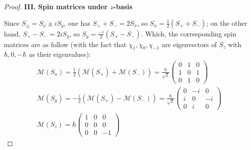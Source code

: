 \documentclass{article}
\begin{document}
\begin{proof}
    \hfil

    \textbf{III. Spin matrices under $z$-basis}

    Since $S_\pm = S_x\pm iS_y$, one has $S_++S_- = 2S_x$, so $S_x = \frac{1}{2}(S_++S_-)$; on the other hand, $S_+-S_- = 2iS_y$, so $S_y = \frac{-i}{2}(S_+-S_-)$. Which, the corresponding spin matrices are as follow (with the fact that $\chi_1,\chi_0,\chi_{-1}$ are eigenvectors of $S_z$ with $\hbar, 0,-\hbar$ as their eigenvalues):
    \begin{align}
        &\mathcal{M}(S_x) = \frac{1}{2}(\mathcal{M}(S_+)+\mathcal{M}(S_-)) = \frac{\hbar}{\sqrt{2}}\begin{pmatrix}
            0&1&0\\1&0&1\\0&1&0
        \end{pmatrix}\\
        &\mathcal{M}(S_y) = -\frac{i}{2}(\mathcal{M}(S_+)-\mathcal{M}(S_-)) = \frac{\hbar}{\sqrt{2}}\begin{pmatrix}
            0&-i&0\\i&0&-i\\0&i&0
        \end{pmatrix}\\
        &\mathcal{M}(S_z) = \hbar\begin{pmatrix}
            1&0&0\\0&0&0\\0&0&-1
        \end{pmatrix}
    \end{align}
\end{proof}

\newpage
\end{document}
